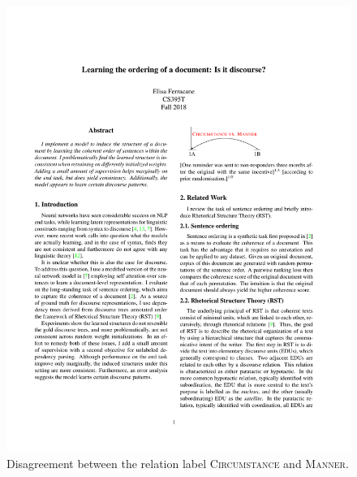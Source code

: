 \begin{figure}
    \centering
    \includegraphics[scale=0.82]{plots/anno_rst_conflicting_labels.pdf}
    \caption{Disagreement between the relation label \textsc{Circumstance} and \textsc{Manner}.}
    \label{fig:anno_rst_conflicting_labels}
\end{figure}

